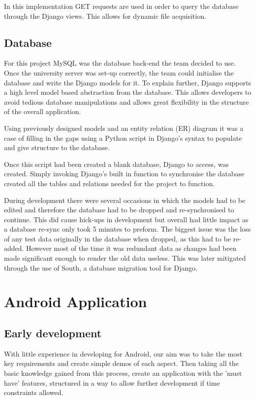 \documentclass{l3proj}
\begin{document}
In this implementation GET requests are used in order to query the database through the Django views. This allows for dynamic file acquisition.

\subsection{Database}
For this project MySQL was the database back-end the team decided to use.
Once the university server was set-up correctly, the team could initialise the database and write the Django models for it. To explain further, Django supports a high level model based abstraction from the database. This allows developers to avoid tedious database manipulations and allows great flexibility in the structure of the overall application.

Using previously designed models and an entity relation (ER) diagram it was a case of filling in the gaps using a Python script in Django's syntax to populate and give structure to the database.

Once this script had been created a blank database, Django to access, was created. Simply invoking Django's built in function to synchronise the database created all the tables and relations needed for the project to function.

During development there were several occasions in which the models had to be edited and therefore the database had to be dropped and re-synchronised to continue. This did cause hick-ups in development but overall had little impact as a database re-sync only took 5 minutes to preform. The biggest issue was the loss of any test data originally in the database when dropped, as this had to be re-added. However most of the time it was redundant data as changes had been made significant enough to render the old data useless. This was later mitigated through the use of South, a database migration tool for Django.

\section{Android Application}

\subsection{Early development} With little experience in developing for Android, our aim was to take the most key requirements and create simple demos of each aspect. Then taking all the basic knowledge gained from this process, create an application with the 'must have' features, structured in a way to allow further development if time constraints allowed.
\end{document}
